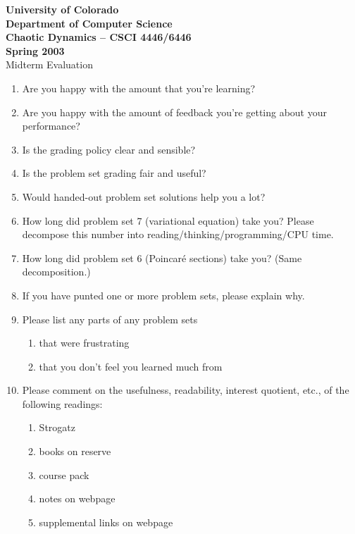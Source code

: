 \pagestyle{empty}
\textwidth=450pt
\textheight=650pt
\topmargin=-40pt
\oddsidemargin=10pt

\parskip=7pt
\parindent=0pt
\begin{center}
{\bf University of Colorado} \\
{\bf Department of Computer Science}\\
\medskip 
{\bf Chaotic Dynamics -- CSCI 4446/6446} \\
{\bf Spring 2003} \\
\medskip 
Midterm Evaluation
\end{center}
\medskip

\begin{enumerate}

\item Are you happy with the amount that you're learning?
\bigskip
\item Are you happy with the amount of feedback you're getting
about your performance?
\bigskip
\item Is the grading policy clear and sensible?
\bigskip

\item Is the problem set grading fair and useful?
\bigskip

\item Would handed-out problem set solutions help you a lot?
\bigskip

\item How long did problem set 7 (variational equation) take you?
Please decompose this number into reading/thinking/programming/CPU
time.
\bigskip

\item How long did problem set 6 (Poincar\'{e} sections) take you?
(Same decomposition.)
\bigskip

\item If you have punted one or more problem sets, please 
explain why.
\bigskip
\bigskip
\bigskip

\item Please list any parts of any problem sets 
\begin{enumerate}
\item that were frustrating
\bigskip
\bigskip
\bigskip
\item that you don't feel you learned much from
\end{enumerate}
\bigskip
\bigskip
\bigskip

\item Please comment on the usefulness, readability, interest quotient, 
etc., of the following readings:
\begin{enumerate}
\item Strogatz
\bigskip
\item books on reserve
\bigskip
\item course pack
\bigskip
\item notes on webpage
\bigskip
\item supplemental links on webpage
\bigskip
\end{enumerate}


\end{enumerate}
